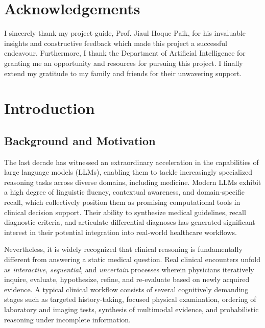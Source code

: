 \documentclass[12pt, a4paper, twoside]{report}
\begin{document}
\chapter*{Acknowledgements}
I sincerely thank my project guide, Prof. Jiaul Hoque Paik, for his invaluable insights and constructive feedback which made this project a successful endeavour. Furthermore, I thank the Department of Artificial Intelligence for granting me an opportunity and resources for pursuing this project. I finally extend my gratitude to my family and friends for their unwavering support.

\tableofcontents
\listoffigures
\listoftables

\clearpage
{}

\chapter{Introduction}

\section{Background and Motivation}
The last decade has witnessed an extraordinary acceleration in the capabilities of large language models (LLMs), enabling them to tackle increasingly specialized reasoning tasks across diverse domains, including medicine. Modern LLMs exhibit a high degree of linguistic fluency, contextual awareness, and domain-specific recall, which collectively position them as promising computational tools in clinical decision support. Their ability to synthesize medical guidelines, recall diagnostic criteria, and articulate differential diagnoses has generated significant interest in their potential integration into real-world healthcare workflows.

Nevertheless, it is widely recognized that clinical reasoning is fundamentally different from answering a static medical question. Real clinical encounters unfold as \textit{interactive, sequential,} and \textit{uncertain} processes wherein physicians iteratively inquire, evaluate, hypothesize, refine, and re-evaluate based on newly acquired evidence. A typical clinical workflow consists of several cognitively demanding stages such as targeted history-taking, focused physical examination, ordering of laboratory and imaging tests, synthesis of multimodal evidence, and probabilistic reasoning under incomplete information. 
\end{document}
